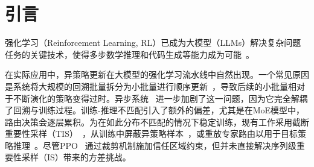 \documentclass{article}
\theoremstyle{plain}
\theoremstyle{definition}
\theoremstyle{remark}
\begin{document}



\printAffiliationsAndNotice{}  

\begin{abstract}

  训练稳定性仍然是大模型（LLMs）强化学习（RL）中的核心挑战。策略陈旧性、异步训练以及训练与推理引擎之间的不匹配都会导致行为策略从当前策略发散，从而带来训练崩溃的风险。重要性采样为这种分布偏移提供了理论上的修正方法，但其存在高方差问题；现有解决方案如 token 级别裁剪和序列级别规范化缺乏统一的理论基础。我们提出了 \textbf{V}ariational s\textbf{E}quence-level \textbf{S}oft \textbf{P}olicy \textbf{O}ptimization (\textbf{VESPO})。通过将方差减小引入提议分布的变分公式中，VESPO 推导出一个闭式重塑核，该核直接作用于序列级别的重要性权重，无需长度规范化。在数学推理基准上的实验表明，VESPO 在高达 $64\times$ 的陈旧率和完全异步执行下仍能保持稳定的训练，并在稠密模型和专家混合（Mixture-of-Experts）模型上均实现了持续提升。代码已公开于 \url{https://github.com/FloyedShen/VESPO}。

\end{abstract}


\section{引言}
\label{sec:intro}

强化学习（Reinforcement Learning, RL）已成为大模型（LLMs）解决复杂问题任务的关键技术，使得多步数学推理和代码生成等能力成为可能~\cite{openai2024o1, anthropic2025claude, DeepSeekAI2025DeepSeekR1IR, Yang2025Qwen3TR}。

在实际应用中，异策略更新在大模型的强化学习流水线中自然出现。一个常见原因是系统将大规模的回溯批量拆分为小批量进行顺序更新~\citep{Yang2025Qwen3TR}，导致后续的小批量相对于不断演化的策略变得过时。异步系统~\citep{fu2025areal, zhong2025streamrl, noukhovitch2024asynchronous} 进一步加剧了这一问题，因为它完全解耦了回溯与训练过程。训练-推理不匹配引入了额外的偏差，尤其是在MoE模型中，路由决策会逐层累积。为在如此分布不匹配的情况下稳定训练，现有工作采用截断重要性采样（TIS）~\cite{liu-li-2025-rl-collapse}，从训练中屏蔽异策略样本~\cite{hu2025stabilizing}，或重放专家路由以用于目标策略推理~\cite{Zheng2025GroupSP, ma2025stabilizingmoereinforcementlearning}。尽管PPO~\citep{Schulman2017ProximalPO} 通过裁剪机制施加信任区域约束，但并未直接解决序列级重要性采样（IS）带来的方差挑战。
\end{document}
